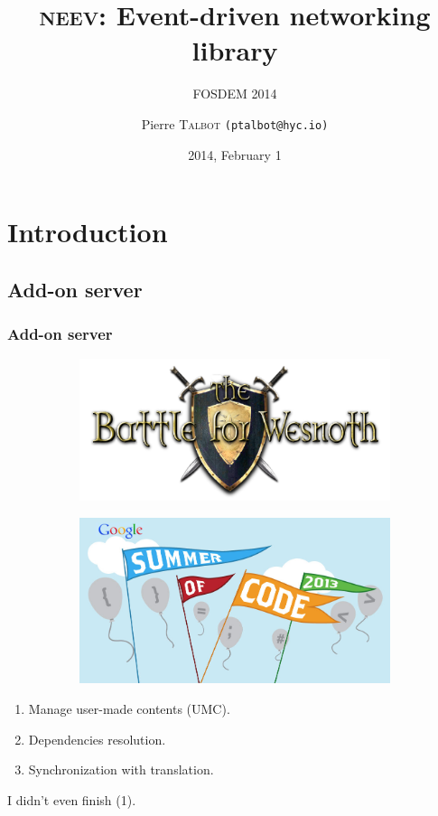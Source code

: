 \documentclass[xcolor=dvipsnames]{beamer}
\title{\textsc{neev}: Event-driven networking library}
\subtitle{FOSDEM 2014}
\author[Pierre \textsc{Talbot}]{Pierre \textsc{Talbot} \texttt{(ptalbot@hyc.io)}}
\institute[UMPC]{University of Pierre et Marie Curie}
\date[]{2014, February 1}
\begin{document}
\maketitle

\section{Introduction}

\subsection{Add-on server}
\begin{frame}
\frametitle{Add-on server}

\begin{figure}[p]
  \centering
  \begin{subfigure}[b]{0.3\textwidth}
    \includegraphics[scale=0.3]{images/wesnoth-logo.png}
  \end{subfigure}
  \qquad \qquad \quad
  \begin{subfigure}[b]{0.3\textwidth}
    \includegraphics[scale=0.1]{images/gsoc2013.jpg}
  \end{subfigure}
\end{figure}

\begin{enumerate}
\item Manage user-made contents (UMC).
\item Dependencies resolution.
\item Synchronization with translation.
\end{enumerate}

\begin{block}{}
I didn't even finish (1).
\end{block}
\end{frame}
\end{document}
